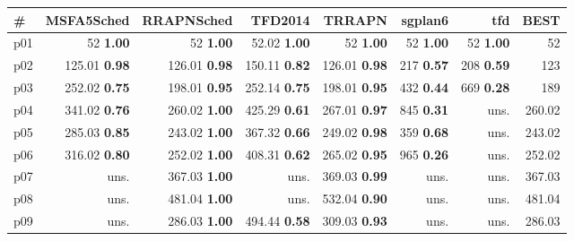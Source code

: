 \begin{tabular}{lrrrrrrr}
\toprule
\textbf{\#} & \textbf{MSFA5Sched} & \textbf{RRAPNSched} & \textbf{TFD2014} & \textbf{TRRAPN} & \textbf{sgplan6} & \textbf{tfd} & \textbf{BEST}\\
\midrule
\multicolumn{1}{l|}{p01} & {\footnotesize 52} \textbf{1.00} & {\footnotesize 52} \textbf{1.00} & {\footnotesize 52.02} \textbf{1.00} & {\footnotesize 52} \textbf{1.00} & {\footnotesize 52} \textbf{1.00} & {\footnotesize 52} \textbf{1.00} & \multicolumn{1}{|r}{52}\\
\multicolumn{1}{l|}{p02} & {\footnotesize 125.01} \textbf{0.98} & {\footnotesize 126.01} \textbf{0.98} & {\footnotesize 150.11} \textbf{0.82} & {\footnotesize 126.01} \textbf{0.98} & {\footnotesize 217} \textbf{0.57} & {\footnotesize 208} \textbf{0.59} & \multicolumn{1}{|r}{123}\\
\multicolumn{1}{l|}{p03} & {\footnotesize 252.02} \textbf{0.75} & {\footnotesize 198.01} \textbf{0.95} & {\footnotesize 252.14} \textbf{0.75} & {\footnotesize 198.01} \textbf{0.95} & {\footnotesize 432} \textbf{0.44} & {\footnotesize 669} \textbf{0.28} & \multicolumn{1}{|r}{189}\\
\multicolumn{1}{l|}{p04} & {\footnotesize 341.02} \textbf{0.76} & {\footnotesize 260.02} \textbf{1.00} & {\footnotesize 425.29} \textbf{0.61} & {\footnotesize 267.01} \textbf{0.97} & {\footnotesize 845} \textbf{0.31} & uns. & \multicolumn{1}{|r}{260.02}\\
\multicolumn{1}{l|}{p05} & {\footnotesize 285.03} \textbf{0.85} & {\footnotesize 243.02} \textbf{1.00} & {\footnotesize 367.32} \textbf{0.66} & {\footnotesize 249.02} \textbf{0.98} & {\footnotesize 359} \textbf{0.68} & uns. & \multicolumn{1}{|r}{243.02}\\
\multicolumn{1}{l|}{p06} & {\footnotesize 316.02} \textbf{0.80} & {\footnotesize 252.02} \textbf{1.00} & {\footnotesize 408.31} \textbf{0.62} & {\footnotesize 265.02} \textbf{0.95} & {\footnotesize 965} \textbf{0.26} & uns. & \multicolumn{1}{|r}{252.02}\\
\multicolumn{1}{l|}{p07} & uns. & {\footnotesize 367.03} \textbf{1.00} & uns. & {\footnotesize 369.03} \textbf{0.99} & uns. & uns. & \multicolumn{1}{|r}{367.03}\\
\multicolumn{1}{l|}{p08} & uns. & {\footnotesize 481.04} \textbf{1.00} & uns. & {\footnotesize 532.04} \textbf{0.90} & uns. & uns. & \multicolumn{1}{|r}{481.04}\\
\multicolumn{1}{l|}{p09} & uns. & {\footnotesize 286.03} \textbf{1.00} & {\footnotesize 494.44} \textbf{0.58} & {\footnotesize 309.03} \textbf{0.93} & uns. & uns. & \multicolumn{1}{|r}{286.03}\\

\end{tabular}
